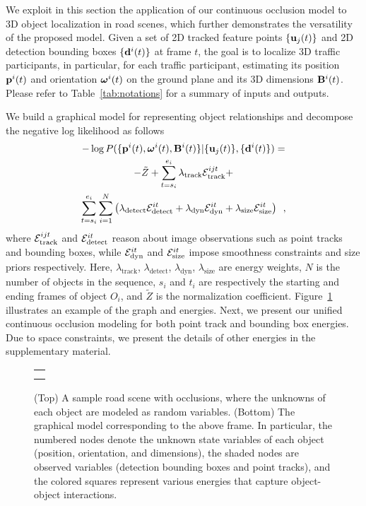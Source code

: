 We exploit in this section the application of our continuous occlusion model to 3D object localization in road scenes, which further demonstrates the versatility of the proposed model. Given a set of 2D tracked feature points $\{\mathbf{u}_j(t)\}$ and 2D detection bounding boxes $\{\mathbf{d}^{i}(t)\}$ at frame $t$, the goal is to localize 3D traffic participants, in particular, for each traffic participant, estimating its position $\mathbf{p}^i(t)$ and orientation $\bm{\omega}^i(t)$ on the ground plane and its 3D dimensions $\mathbf{B}^i(t)$. Please refer to Table~\ref{tab:notations} for a summary of inputs and outputs. 

We build a graphical model for representing object relationships and decompose the negative log likelihood as follows
%
\begin{multline*}
  -\log{P(\{ \mathbf{p}^i(t) , \bm{\omega}^i(t) , \mathbf{B}^i(t) \} | \{\mathbf{u}_j(t)\} , \{\mathbf{d}^{i}(t)\} )} = \\
  -\tilde{Z} 
  + \sum_{t=s_i}^{e_i} \lambda_{\text{track}}\mathcal{E}^{ijt}_{\text{track}}
  + \\ 
  \sum_{t=s_i}^{e_i} \sum_{i=1}^N  
  \left(
    \lambda_{\text{detect}}\mathcal{E}^{it}_{\text{detect}}
    + \lambda_{\text{dyn}}\mathcal{E}^{it}_{\text{dyn}}    
    + \lambda_{\text{size}}\mathcal{E}^{it}_{\text{size}}
  \right)
  \enspace,
\end{multline*}
%
where $\mathcal{E}^{ijt}_{\text{track}}$ and $\mathcal{E}^{it}_{\text{detect}}$ reason about image observations such as point tracks and bounding boxes, while $\mathcal{E}^{it}_{\text{dyn}}$  and $\mathcal{E}^{it}_{\text{size}}$ impose smoothness constraints and size priors respectively. Here, $\lambda_{\text{track}}$, $\lambda_{\text{detect}}$, $\lambda_{\text{dyn}}$, $\lambda_{\text{size}}$ are energy weights, $N$ is the number of objects in the sequence, $s_i$ and $t_i$ are respectively the starting and ending frames of object $O_i$, and $\tilde{Z}$ is the normalization coefficient. Figure~\ref{fig:graphmodel} illustrates an example of the graph and energies. Next, we present our unified continuous occlusion modeling for both point track and bounding box energies. Due to space constraints, we present the details of other energies in the supplementary material.

\begin{figure}
  \centering
  \begin{tabular}{c}
    \newcommand{\imagewidth}{7.5cm}
      \hspace{-0.8cm}
     \\
      \hspace{-0.8cm}
    
  \end{tabular}
  \caption{\small (Top) A sample road scene with occlusions, where the unknowns of each object are modeled as random variables. (Bottom) The graphical model corresponding to the above frame. In particular, the numbered nodes denote the unknown state variables of each object (position, orientation, and dimensions), the shaded nodes are observed variables (detection bounding boxes and point tracks), and the colored squares represent various energies that capture object-object interactions.}
  \label{fig:graphmodel}
\end{figure}



